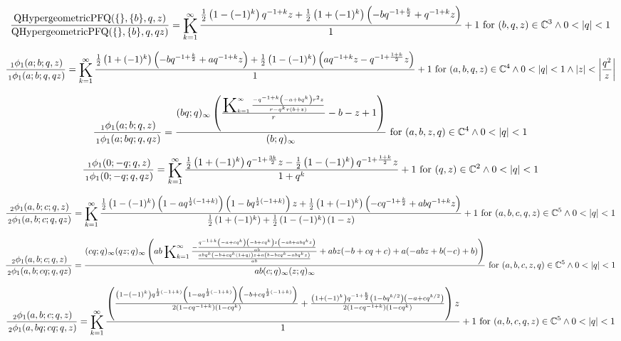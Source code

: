 \documentclass{article}
\newcommand{\bigK}{\mathop{\raisebox{-5pt}{\huge K}}}
\begin{document}
\[\frac{\text{QHypergeometricPFQ}(\{\},\{b\},q,z)}{\text{QHypergeometricPFQ}(\{\},\{b\},q,q z)}=\bigK_{k=1}^{\infty}\frac{\frac{1}{2} \left(1-(-1)^k\right) q^{-1+k} z+\frac{1}{2} \left(1+(-1)^k\right) \left(-b q^{-1+\frac{k}{2}}+q^{-1+k} z\right)}{1}+1\text{ for }(b,q,z)\in \mathbb{C}^3\land 0<\left| q\right| <1\] 

\[\frac{\, _1\phi _1(a;b;q,z)}{\, _1\phi _1(a;b;q,q z)}=\bigK_{k=1}^{\infty}\frac{\frac{1}{2} \left(1+(-1)^k\right) \left(-b q^{-1+\frac{k}{2}}+a q^{-1+k} z\right)+\frac{1}{2} \left(1-(-1)^k\right) \left(a q^{-1+k} z-q^{-1+\frac{1+k}{2}} z\right)}{1}+1\text{ for }(a,b,q,z)\in \mathbb{C}^4\land 0<\left| q\right| <1\land \left| z\right| <\left| \frac{q^2}{z}\right|\] 

\[\frac{\, _1\phi _1(a;b;q,z)}{\, _1\phi _1(a;b q;q,q z)}=\frac{(b q;q)_{\infty } \left(\frac{\bigK_{k=1}^{\infty}\frac{-q^{-1+k} \left(-a+b q^k\right) r^2 z}{r-q^k r (b+z)}}{r}-b-z+1\right)}{(b;q)_{\infty }}\text{ for }(a,b,z,q)\in \mathbb{C}^4\land 0<\left| q\right| <1\] 

\[\frac{\, _1\phi _1(0;-q;q,z)}{\, _1\phi _1(0;-q;q,q z)}=\bigK_{k=1}^{\infty}\frac{\frac{1}{2} \left(1+(-1)^k\right) q^{-1+\frac{3 k}{2}} z-\frac{1}{2} \left(1-(-1)^k\right) q^{-1+\frac{1+k}{2}} z}{1+q^k}+1\text{ for }(q,z)\in \mathbb{C}^2\land 0<\left| q\right| <1\] 

\[\frac{\, _2\phi _1(a,b;c;q,z)}{\, _2\phi _1(a,b;c;q,q z)}=\bigK_{k=1}^{\infty}\frac{\frac{1}{2} \left(1-(-1)^k\right) \left(1-a q^{\frac{1}{2} (-1+k)}\right) \left(1-b q^{\frac{1}{2} (-1+k)}\right) z+\frac{1}{2} \left(1+(-1)^k\right) \left(-c q^{-1+\frac{k}{2}}+a b q^{-1+k} z\right)}{\frac{1}{2} \left(1+(-1)^k\right)+\frac{1}{2} \left(1-(-1)^k\right) (1-z)}+1\text{ for }(a,b,c,q,z)\in \mathbb{C}^5\land 0<\left| q\right| <1\] 

\[\frac{\, _2\phi _1(a,b;c;q,z)}{\, _2\phi _1(a,b;c q;q,q z)}=\frac{(c q;q)_{\infty } (q z;q)_{\infty } \left(a b \bigK_{k=1}^{\infty}\frac{-\frac{q^{-1+k} \left(-a+c q^k\right) \left(-b+c q^k\right) z \left(-a b+a b q^k z\right)}{a b}}{\frac{a b q^k \left(-b+c q^k (1+q)\right) z+a \left(b-b c q^k-a b q^k z\right)}{a b}}+a b z (-b+c q+c)+a (-a b z+b (-c)+b)\right)}{a b (c;q)_{\infty } (z;q)_{\infty }}\text{ for }(a,b,c,z,q)\in \mathbb{C}^5\land 0<\left| q\right| <1\] 

\[\frac{\, _2\phi _1(a,b;c;q,z)}{\, _2\phi _1(a,b q;c q;q,z)}=\bigK_{k=1}^{\infty}\frac{\left(\frac{\left(1-(-1)^k\right) q^{\frac{1}{2} (-1+k)} \left(1-a q^{\frac{1}{2} (-1+k)}\right) \left(-b+c q^{\frac{1}{2} (-1+k)}\right)}{2 \left(1-c q^{-1+k}\right) \left(1-c q^k\right)}+\frac{\left(1+(-1)^k\right) q^{-1+\frac{k}{2}} \left(1-b q^{k/2}\right) \left(-a+c q^{k/2}\right)}{2 \left(1-c q^{-1+k}\right) \left(1-c q^k\right)}\right) z}{1}+1\text{ for }(a,b,c,q,z)\in \mathbb{C}^5\land 0<\left| q\right| <1\] 
\end{document}

